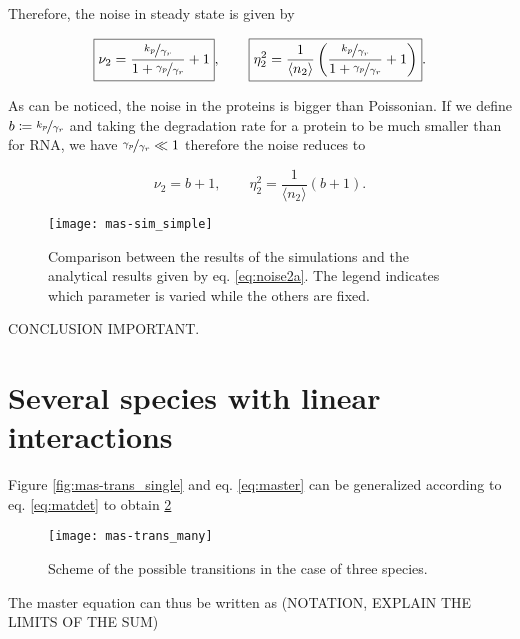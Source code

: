 Therefore, the noise in steady state is given by

\begin{equation}
\label{noise2}
\boxed{\nu_2 = \frac{\nicefrac{k_p}{\gamma_r}}{1+\nicefrac{\gamma_p}{\gamma_r}}+1}, \quad \quad \boxed{\eta_2^2 = \frac{1}{\langle n_2\rangle}\left(\frac{\nicefrac{k_p}{\gamma_r}}{1+\nicefrac{\gamma_p}{\gamma_r}}+1\right)}.
\end{equation}

As can be noticed, the noise in the proteins is bigger than Poissonian. If we define $b\coloneqq \nicefrac{k_p}{\gamma_r}$ and taking the degradation rate for a protein to be much smaller than for RNA, we have $\nicefrac{\gamma_p}{\gamma_r} \ll 1$ therefore the noise reduces to

\begin{equation}
\label{eq:noise2a}
\boxed{\nu_2 = b+1}, \quad \quad \boxed{\eta_2^2 = \frac{1}{\langle n_2\rangle}\left(b+1\right)}.
\end{equation}

\begin{figure}[H]
  \centering
  \texttt{[image: mas-sim\_simple]}
  \caption[Noise in proteins: comparing analytical results and simulations]{\label{fig:mas-sim_simple} Comparison between the results of the simulations and the analytical results given by eq. \ref{eq:noise2a}. The legend indicates which parameter is varied while the others are fixed.}
\end{figure}

CONCLUSION IMPORTANT.

\section{Several species with linear interactions}

\vspace{5cm}
Figure \ref{fig:mas-trans_single} and eq. \ref{eq:master} can be generalized according to eq. \ref{eq:matdet} to obtain \ref{fig:mas-trans_many}

\begin{figure}[H]
  \centering
  \texttt{[image: mas-trans\_many]}
  \caption[Transitions between states in general] {\label{fig:mas-trans_many} Scheme of the possible transitions in the case of three species.}
\end{figure}

The master equation can thus be written as (NOTATION, EXPLAIN THE LIMITS OF THE SUM)

